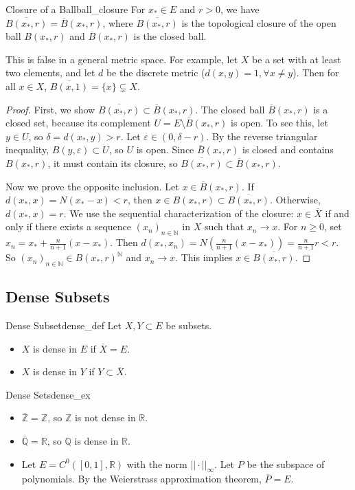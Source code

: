 \documentclass[11pt, a4paper]{article}
\newcommand{\R}{\mathbb{R}}
\newcommand{\N}{\mathbb{N}}
\newcommand{\Z}{\mathbb{Z}}
\newcommand{\Q}{\mathbb{Q}}
\newcommand{\eps}{\varepsilon}
\begin{document}
\begin{proposition}{Closure of a Ball}{ball_closure}
For $x_* \in E$ and $r > 0$, we have $\overline{B(x_*, r)} = \overline{B}(x_*, r)$, where $\overline{B(x_*, r)}$ is the topological closure of the open ball $B(x_*, r)$ and $\overline{B}(x_*, r)$ is the closed ball.
\end{proposition}
\begin{remark}{}{}
This is false in a general metric space.
For example, let $X$ be a set with at least two elements, and let $d$ be the discrete metric ($d(x,y) = 1, \forall x \neq y$).
Then for all $x \in X$, $\overline{B(x, 1)} = \{x\} \subsetneq X$.
\end{remark}
\begin{proof}
First, we show $\overline{B(x_*, r)} \subset \overline{B}(x_*, r)$.
The closed ball $\overline{B}(x_*, r)$ is a closed set, because its complement $U = E \setminus \overline{B}(x_*, r)$ is open.
To see this, let $y \in U$, so $\delta = d(x_*, y) > r$.
Let $\eps \in (0, \delta - r)$. By the reverse triangular inequality, $B(y, \eps) \subset U$, so $U$ is open.
Since $\overline{B}(x_*, r)$ is closed and contains $B(x_*, r)$, it must contain its closure, so $\overline{B(x_*, r)} \subset \overline{B}(x_*, r)$.

Now we prove the opposite inclusion. Let $x \in \overline{B}(x_*, r)$.
If $d(x_*, x) = N(x_* - x) < r$, then $x \in B(x_*, r) \subset \overline{B(x_*, r)}$.
Otherwise, $d(x_*, x) = r$.
We use the sequential characterization of the closure: $x \in \overline{X}$ if and only if there exists a sequence $(x_n)_{n \in \N}$ in $X$ such that $x_n \to x$.
For $n \ge 0$, set $x_n = x_* + \frac{n}{n+1}(x - x_*)$.
Then $d(x_*, x_n) = N(\frac{n}{n+1}(x - x_*)) = \frac{n}{n+1}r < r$.
So $(x_n)_{n \in \N} \in B(x_*, r)^{\N}$ and $x_n \to x$. This implies $x \in \overline{B(x_*, r)}$.
\end{proof}

\subsection{Dense Subsets}
\begin{definition}{Dense Subset}{dense_def}
Let $X, Y \subset E$ be subsets.
\begin{itemize}
    \item $X$ is dense in $E$ if $\overline{X} = E$.
    \item $X$ is dense in $Y$ if $Y \subset \overline{X}$.
\end{itemize}
\end{definition}
\begin{example}{Dense Sets}{dense_ex}
\begin{itemize}
    \item $\overline{\Z} = \Z$, so $\Z$ is not dense in $\R$.
    \item $\overline{\Q} = \R$, so $\Q$ is dense in $\R$.
    \item Let $E = C^0([0,1], \R)$ with the norm $||\cdot||_\infty$. Let $P$ be the subspace of polynomials. By the Weierstrass approximation theorem, $\overline{P} = E$.
\end{itemize}
\end{example}
\end{document}
